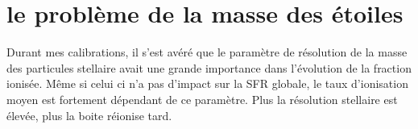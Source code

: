 \section{le problème de la masse des étoiles}




Durant mes calibrations, il s'est avéré que le paramètre de résolution de la masse des particules stellaire avait une grande importance dans l'évolution de la fraction ionisée.
Même si celui ci n'a pas d'impact sur la SFR globale, le taux d'ionisation moyen est fortement dépendant de ce paramètre.
Plus la résolution stellaire est élevée, plus la boite réionise tard.








